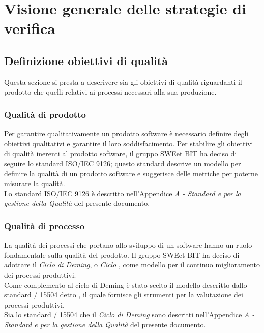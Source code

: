 \section{Visione generale delle strategie di verifica}
  \subsection{Definizione obiettivi di qualità}
  Questa sezione si presta a descrivere sia gli obiettivi di qualità riguardanti
  il prodotto che quelli relativi ai processi necessari alla sua produzione.
  \subsubsection{Qualità di prodotto}
    Per garantire qualitativamente un prodotto software è necessario definire
    degli obiettivi qualitativi e garantire il loro soddisfacimento. Per
    stabilire gli obiettivi di qualità inerenti al prodotto software, il gruppo
    SWEet BIT ha deciso di seguire lo standard ISO/IEC 9126; questo standard
    descrive un modello per definire la qualità di un prodotto software e
    suggerisce delle metriche per poterne misurare la qualità.\\
    Lo standard ISO/IEC 9126 è descritto nell'Appendice \emph{A - Standard e
     per la gestione della Qualità} del presente documento.

  \subsubsection{Qualità di processo}
    La qualità dei processi che portano allo sviluppo di un software hanno un
    ruolo fondamentale sulla qualità del prodotto. Il gruppo SWEet BIT ha deciso
    di adottare il \emph{Ciclo di Deming}, o \emph{Ciclo} ,
    come modello per il continuo miglioramento dei processi produttivi. \\
    Come complemento al ciclo di Deming è stato scelto il modello descritto
    dallo standard / 15504 detto
    , il quale fornisce gli strumenti per la valutazione dei
    processi produttivi.\\
    Sia lo standard / 15504 che il
    \emph{Ciclo di Deming} sono descritti nell'Appendice \emph{A - Standard e
     per la gestione della Qualità} del presente documento.


